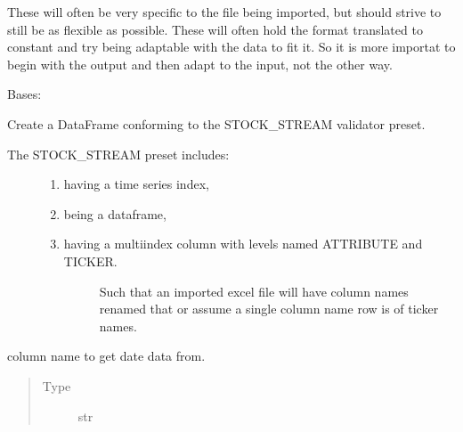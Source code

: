 \documentclass[letterpaper,10pt,english]{sphinxmanual}
\begin{document}
These will often be very specific to the file being imported, but should
strive to still be as flexible as possible. These will often hold the format
translated to constant and try being adaptable with the data to fit it. So
it is more importat to begin with the output and then adapt to the input, not
the other way.

\begin{fulllineitems}
\label{\detokenize{dalio.translator:dalio.translator.file.StockStreamFileTranslator}}
Bases: {\hyperref[\detokenize{dalio.translator:dalio.translator.translator.Translator}]{}}

Create a DataFrame conforming to the STOCK\_STREAM validator preset.
\begin{description}
\item[{The STOCK\_STREAM preset includes:}] \leavevmode\begin{enumerate}
%
\item {} 
having a time series index,

\item {} 
being a dataframe,

\item {} \begin{description}
\item[{having a multiindex column with levels named ATTRIBUTE and TICKER.}] \leavevmode
Such that an imported excel file will have column names renamed
that or assume a single column name row is of ticker names.

\end{description}

\end{enumerate}

\end{description}

\begin{fulllineitems}
\label{\detokenize{dalio.translator:dalio.translator.file.StockStreamFileTranslator.date_col}}
column name to get date data from.
\begin{quote}\begin{description}
\item[{Type}] \leavevmode
str


\end{description}
\end{quote}
\end{fulllineitems}
\end{fulllineitems}
\end{document}
